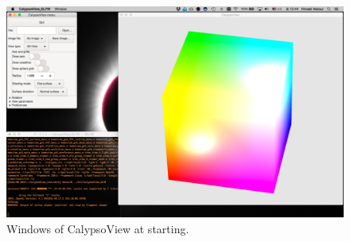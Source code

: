 %
\begin{figure}[htbp]
\begin{center}
\includegraphics*[width=120mm]{Images/Desktop_1}
\end{center}
\caption{Windows of CalypsoView at starting.}
\label{fig:start_linux}
\end{figure}
%



